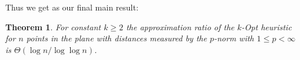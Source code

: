\documentclass[a4paper, 11pt]{article}
\newtheorem{theorem}{Theorem}
\def\blue#1{#1}
\begin{document}
 
Thus we get as our final main result:
\begin{theorem} For constant $k \ge 2$ the 
approximation ratio of the $k$-Opt heuristic for $n$ points in the plane with distances measured by the $p$-norm \blue{with $1\le p < \infty$} is $\Theta(\log n / \log \log n)$.
\label{thm:LpNormResult}
\end{theorem}


 




 
\end{document}
